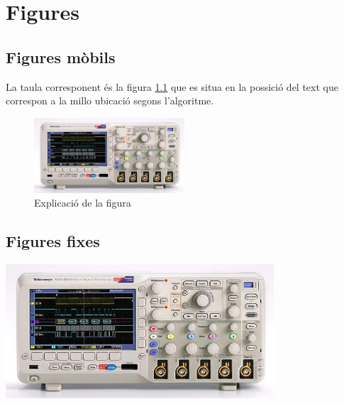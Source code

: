 \chapter{Figures}
\section{Figures mòbils}
La taula corresponent és la figura \ref{fig:osci} que es situa en la possició del text que correspon a la millo ubicació segons l'algoritme.
\begin{figure}[h]
  \centering
  \includegraphics[width=0.5\textwidth]{osci.jpg}
  \caption{Explicació de la figura}
  \label{fig:osci}
\end{figure}

\section{Figures fixes}
\includegraphics[width=0.75\textwidth]{osci.jpg}

